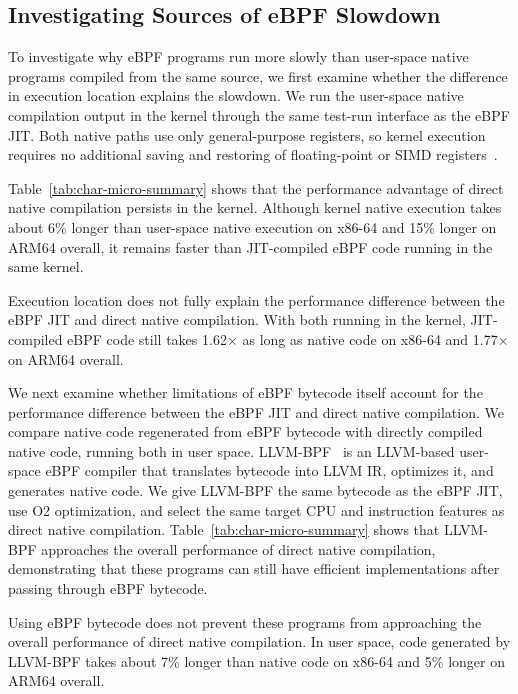 \subsection{Investigating Sources of eBPF Slowdown}
\label{subsec:char-sources}
\label{subsec:char-idiom}

To investigate why eBPF programs run more slowly than user-space native programs compiled from the same source, we first examine whether the difference in execution location explains the slowdown. We run the user-space native compilation output in the kernel through the same test-run interface as the eBPF JIT. Both native paths use only general-purpose registers, so kernel execution requires no additional saving and restoring of floating-point or SIMD registers~\cite{linuxndfloatingpoint}.

Table~\ref{tab:char-micro-summary} shows that the performance advantage of direct native compilation persists in the kernel. Although kernel native execution takes about 6\% longer than user-space native execution on x86-64 and 15\% longer on ARM64 overall, it remains faster than JIT-compiled eBPF code running in the same kernel.

\begin{finding}[unbreakable]
\finlabel Execution location does not fully explain the performance difference between the eBPF JIT and direct native compilation. With both running in the kernel, JIT-compiled eBPF code still takes 1.62$\times$ as long as native code on x86-64 and 1.77$\times$ on ARM64 overall.
\end{finding}

We next examine whether limitations of eBPF bytecode itself account for the performance difference between the eBPF JIT and direct native compilation. We compare native code regenerated from eBPF bytecode with directly compiled native code, running both in user space. LLVM-BPF~\cite{zheng2025extending} is an LLVM-based user-space eBPF compiler that translates bytecode into LLVM IR, optimizes it, and generates native code. We give LLVM-BPF the same bytecode as the eBPF JIT, use O2 optimization, and select the same target CPU and instruction features as direct native compilation. Table~\ref{tab:char-micro-summary} shows that LLVM-BPF approaches the overall performance of direct native compilation, demonstrating that these programs can still have efficient implementations after passing through eBPF bytecode.



\begin{finding}[unbreakable]
\finlabel Using eBPF bytecode does not prevent these programs from approaching the overall performance of direct native compilation. In user space, code generated by LLVM-BPF takes about 7\% longer than native code on x86-64 and 5\% longer on ARM64 overall.
\end{finding}

